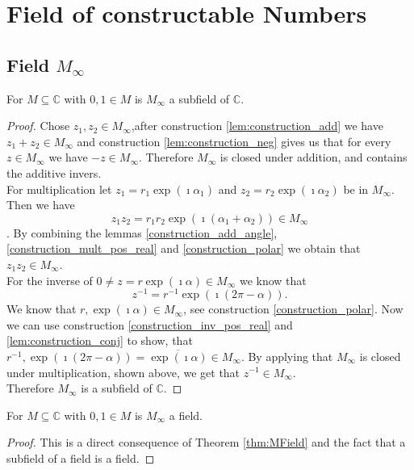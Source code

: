 \chapter{Field of constructable Numbers}
\section[Filed of Constructable Numbers]{Field $M_{\infty}$}
\begin{theorem}
    \label{thm:MField}
    \leanok
    For $M\subseteq \mathbb{C}$ with $0,1 \in M$ is $M_{\infty}$ a subfield of $\mathbb{C}$.
\end{theorem}
\begin{proof}
    Chose $z_1, z_2 \in M_{\infty}$,after construction \ref{lem:construction_add}
    we have $z_1 + z_2 \in M_{\infty}$ and construction \ref{lem:construction_neg}
    gives us that for every $z \in M_{\infty}$ we have $-z \in M_{\infty}$. Therefore $M_{\infty}$ is closed under addition, and contains the additive invers.\\
    For multiplication let $z_1 = r_1 \exp(\imath \alpha_1)$ and $z_2 = r_2 \exp(\imath \alpha_2)$ be in $M_{\infty}$. Then we have 
    $$z_1 z_2 = r_1 r_2 \exp(\imath (\alpha_1 + \alpha_2)) \in M_{\infty}$$. By combining the lemmas \ref{construction_add_angle}, \ref{construction_mult_pos_real} and \ref{construction_polar}
    we obtain that $z_1 z_2 \in M_{\infty}$.\\
    For the inverse of $0 \ne z = r \exp(\imath \alpha) \in M_{\infty}$ we know that $$z^{-1} = r^{-1} \exp(\imath(2\pi - \alpha)).$$ We know that $r, \exp(\imath \alpha) \in M_{\infty}$, see construction \ref{construction_polar}.
    Now we can use construction \ref{construction_inv_pos_real} and \ref{lem:construction_conj} to show,
    that $r^{-1}, \exp(\imath(2\pi - \alpha)) = \overline{\exp(\imath\alpha)} \in M_{\infty}$. By applying that $M_{\infty}$ is closed under multiplication, shown above, we get that $z^{-1} \in M_{\infty}$.\\
    Therefore $M_{\infty}$ is a subfield of $\mathbb{C}$.
\end{proof}

\begin{corollary} 
    \label{cor:MField_field}
    For $M\subseteq \mathbb{C}$ with $0,1 \in M$ is $M_{\infty}$ a field.
\end{corollary}
\begin{proof}
    This is a direct consequence of Theorem \ref{thm:MField} and the fact that a subfield of a field is a field.
\end{proof}


